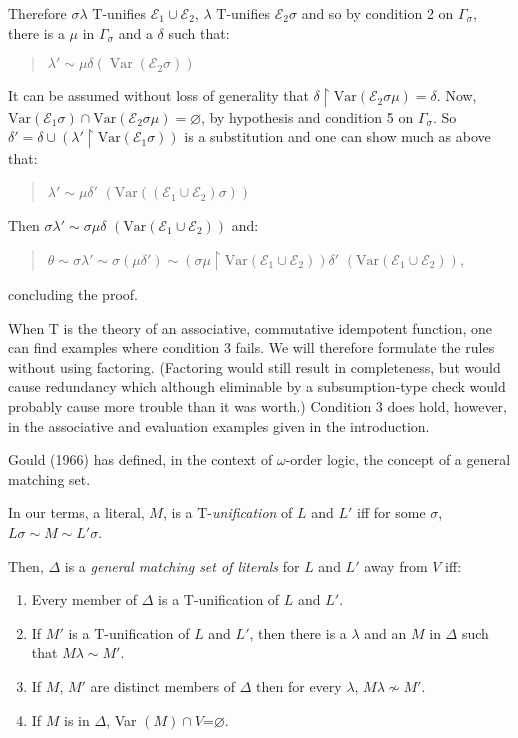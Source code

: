 \documentclass[letterpaper]{report}
\begin{document}
Therefore $\sigma\lambda$ $\mathrm{T}$-unifies $\mathcal{E}_{1}\cup\mathcal{E}_{2}$, $\lambda$ $\mathrm{T}$-unifies $\mathcal{E}_{2}\sigma$ and so by condition 2 on $\Gamma_{\sigma}$, there is a $\mu$ in $\Gamma_{\sigma}$ and a $\delta$ such that:
\begin{quote}
$\lambda'\sim\mu\delta(\operatorname{Var}(\mathcal{E}_{2}\sigma))$
\end{quote}

It can be assumed without loss of generality that $\delta\upharpoonright\mathrm{Var}(\mathcal{E}_{2}\sigma\mu)=\delta$. Now, $\mathrm{Var}(\mathcal{E}_{1}\sigma)\cap\mathrm{Var}(\mathcal{E}_{2}\sigma\mu) =\varnothing$, by hypothesis and condition 5 on $\Gamma_{\sigma}$. So $\delta'=\delta\cup(\lambda'\upharpoonright\mathrm{Var}( \mathcal{E}_{1}\sigma))$ is a substitution and one can show much as above that:
\begin{quote}
$\lambda'\sim\mu\delta'$ \quad$(\mathrm{Var}((\mathcal{E}_{1}\cup\mathcal{E}_{2})\sigma))$
\end{quote}
Then $\sigma\lambda'\sim\sigma\mu\delta$ \quad $(\mathrm{Var}(\mathcal{E}_{1}\cup\mathcal{E}_{2}))$ and:

\begin{quote}
$\theta \sim \sigma\lambda' \sim \sigma(\mu \delta') \sim (\sigma\mu\upharpoonright\mathrm{Var}(\mathcal{E}_{ 1}\cup\mathcal{E}_{2}))\delta'$   \quad$(\mathrm{Var}(\mathcal{E}_{1}\cup \mathcal{E}_{2}))$,
\end{quote}
concluding the proof.

When T is the theory of an associative, commutative idempotent function,
one can find examples where condition 3 fails. We will therefore
formulate the rules without using factoring. (Factoring would still
result in completeness, but would cause redundancy which although
eliminable by a subsumption-type check would probably cause more trouble
than it was worth.) Condition 3 does hold, however, in the associative
and evaluation examples given in the introduction.

Gould (1966) has defined, in the context of $\omega$-order logic, the
concept of a general matching set.

In our terms, a literal, $M$, is a $\mathrm{T}$-\emph{unification} of $L$ and
$L'$ iff for some $\sigma$,
$L\sigma\sim M\sim L'\sigma$.

Then, $\Delta$ is a \emph{general matching set of literals} for $L$
and $L'$ away from $V$ iff:

\begin{enumerate}
	\def\labelenumi{(\arabic{enumi})}
	\item
	Every member of $\Delta$ is a $\mathrm{T}$-unification of $L$
	and $L'$.
	\item
	If $M'$ is a $\mathrm{T}$-unification of $L$ and
	$L'$, then there is a $\lambda$ and an $M$ in $\Delta$
	such that $M\lambda\sim M'$.
	\item
	If $M$, $M'$ are distinct members of $\Delta$ then for
	every $\lambda$, $M\lambda\nsim M'$.
	\item
	If $M$ is in $\Delta$, Var $(M)\cap$$V$=$\varnothing$.
\end{enumerate}
\end{document}
